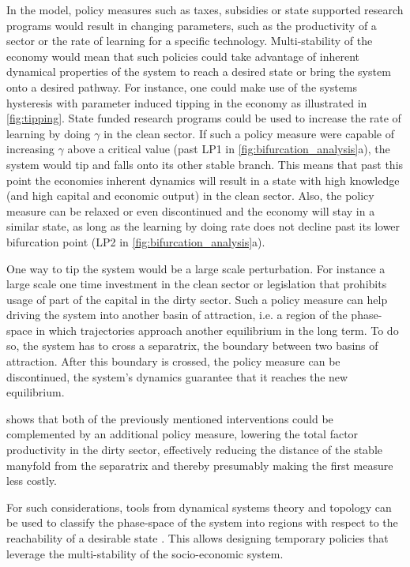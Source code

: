 In the model, policy measures such as taxes, subsidies or state supported research programs would result in changing parameters, such as the productivity of a sector or the rate of learning for a specific technology. 
Multi-stability of the economy would mean that such policies could take advantage of inherent dynamical properties of the system to reach a desired state or bring the system onto a desired pathway.
For instance, one could make use of the systems hysteresis with parameter induced tipping in the economy as illustrated in \cref{fig:tipping}. State funded research programs could be used to increase the rate of learning by doing $\gamma$ in the clean sector. If such a policy measure were capable of increasing $\gamma$ above a critical value (past LP1 in \cref{fig:bifurcation_analysis}a), the system would tip and falls onto its other stable branch. This means that past this point the economies inherent dynamics will result in a state with high knowledge (and high capital and economic output) in the clean sector. Also, the policy measure can be relaxed or even discontinued and the economy will stay in a similar state, as long as the learning by doing rate does not decline past its lower bifurcation point (LP2 in \cref{fig:bifurcation_analysis}a).

One way to tip the system would be a large scale perturbation. For instance a large scale one time investment in the clean sector or legislation that prohibits usage of part of the capital in the dirty sector.
Such a policy measure can help driving the system into another basin of attraction, i.e. a region of the phase-space in which trajectories approach another equilibrium in the long term. 
To do so, the system has to cross a separatrix, the boundary between two basins of attraction. 
After this boundary is crossed, the policy measure can be discontinued, the system's dynamics guarantee that it reaches the new equilibrium.

 shows that both of the previously mentioned interventions could be complemented by an additional policy measure, lowering the total factor productivity in the dirty sector, effectively reducing the distance of the stable manyfold from the separatrix and thereby presumably making the first measure less costly.

For such considerations, tools from dynamical systems theory and topology can be used to classify the phase-space of the system into regions with respect to the reachability of a desirable state \citep{Heitzig2016,Nitzbon2017}. This allows designing temporary policies that leverage the multi-stability of the socio-economic system.

